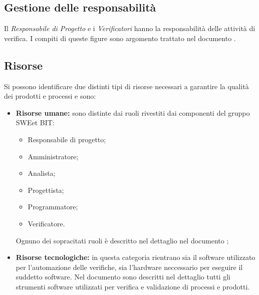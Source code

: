   \subsection{Gestione delle responsabilità}
    Il \emph{Responsabile di Progetto} e i \emph{Verificatori} hanno la responsabilità delle attività di verifica.
    I compiti di queste figure sono argomento trattato nel documento .

  \subsection{Risorse}
    Si possono identificare due distinti tipi di risorse necessari a garantire la qualità dei prodotti e processi e sono:
    \begin{itemize}
      \item \textbf{Risorse umane:} sono distinte dai ruoli rivestiti dai componenti del gruppo SWEet BIT:
      \begin{itemize}
        \item Responsabile di progetto;
        \item Amministratore;
        \item Analista;
        \item Progettista;
        \item Programmatore;
        \item Verificatore.
      \end{itemize}
      Ognuno dei sopracitati ruoli è descritto nel dettaglio nel documento ;
      \item \textbf{Risorse tecnologiche:} in questa categoria rientrano sia il software utilizzato per l'automazione delle verifiche,
      sia l'hardware neccessario per eseguire il suddetto software. Nel documento  sono descritti nel dettaglio
      tutti gli strumenti software utilizzati per verifica e validazione di processi e prodotti.
    \end{itemize}
